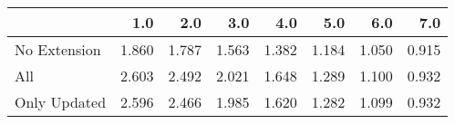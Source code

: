 \begin{tabular}{lrrrrrrr}
\toprule
{} &   1.0 &   2.0 &   3.0 &   4.0 &   5.0 &   6.0 &   7.0 \\
\midrule
No Extension & 1.860 & 1.787 & 1.563 & 1.382 & 1.184 & 1.050 & 0.915 \\
All          & 2.603 & 2.492 & 2.021 & 1.648 & 1.289 & 1.100 & 0.932 \\
Only Updated & 2.596 & 2.466 & 1.985 & 1.620 & 1.282 & 1.099 & 0.932 \\
\bottomrule
\end{tabular}
